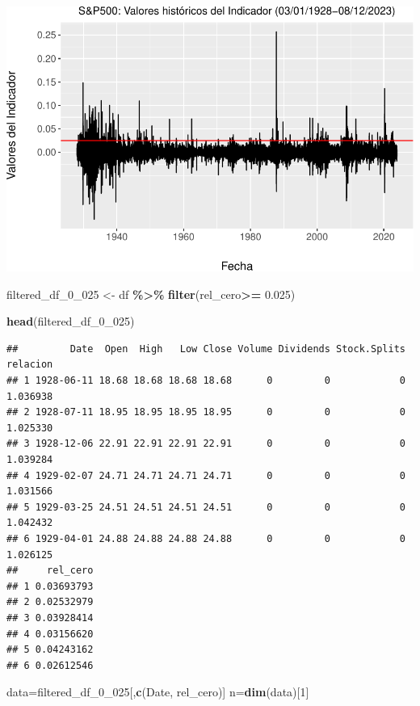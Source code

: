 \documentclass[
  oneside]{article}
\newenvironment{Shaded}{\begin{snugshade}}{\end{snugshade}}
\newcommand{\DecValTok}[1]{\textcolor[rgb]{0.00,0.00,0.81}{#1}}
\newcommand{\FloatTok}[1]{\textcolor[rgb]{0.00,0.00,0.81}{#1}}
\newcommand{\FunctionTok}[1]{\textcolor[rgb]{0.13,0.29,0.53}{\textbf{#1}}}
\newcommand{\NormalTok}[1]{#1}
\newcommand{\OtherTok}[1]{\textcolor[rgb]{0.56,0.35,0.01}{#1}}
\newcommand{\SpecialCharTok}[1]{\textcolor[rgb]{0.81,0.36,0.00}{\textbf{#1}}}
\newcommand{\StringTok}[1]{\textcolor[rgb]{0.31,0.60,0.02}{#1}}
\begin{document}
\includegraphics{Entrega_Laura_Montaldo_files/figure-latex/unnamed-chunk-15-1.pdf}

\begin{Shaded}
\begin{Highlighting}[]
\NormalTok{filtered\_df\_0\_025 }\OtherTok{\textless{}{-}}\NormalTok{ df }\SpecialCharTok{\%\textgreater{}\%}
  \FunctionTok{filter}\NormalTok{(rel\_cero}\SpecialCharTok{\textgreater{}=} \FloatTok{0.025}\NormalTok{)}
\end{Highlighting}
\end{Shaded}

\begin{Shaded}
\begin{Highlighting}[]
\FunctionTok{head}\NormalTok{(filtered\_df\_0\_025)}
\end{Highlighting}
\end{Shaded}

\begin{verbatim}
##         Date  Open  High   Low Close Volume Dividends Stock.Splits relacion
## 1 1928-06-11 18.68 18.68 18.68 18.68      0         0            0 1.036938
## 2 1928-07-11 18.95 18.95 18.95 18.95      0         0            0 1.025330
## 3 1928-12-06 22.91 22.91 22.91 22.91      0         0            0 1.039284
## 4 1929-02-07 24.71 24.71 24.71 24.71      0         0            0 1.031566
## 5 1929-03-25 24.51 24.51 24.51 24.51      0         0            0 1.042432
## 6 1929-04-01 24.88 24.88 24.88 24.88      0         0            0 1.026125
##     rel_cero
## 1 0.03693793
## 2 0.02532979
## 3 0.03928414
## 4 0.03156620
## 5 0.04243162
## 6 0.02612546
\end{verbatim}

\begin{Shaded}
\begin{Highlighting}[]
\NormalTok{data}\OtherTok{=}\NormalTok{filtered\_df\_0\_025[,}\FunctionTok{c}\NormalTok{(}\StringTok{\textquotesingle{}Date\textquotesingle{}}\NormalTok{, }\StringTok{\textquotesingle{}rel\_cero\textquotesingle{}}\NormalTok{)]}
\NormalTok{n}\OtherTok{=}\FunctionTok{dim}\NormalTok{(data)[}\DecValTok{1}\NormalTok{]}
\end{Highlighting}
\end{Shaded}
\end{document}
